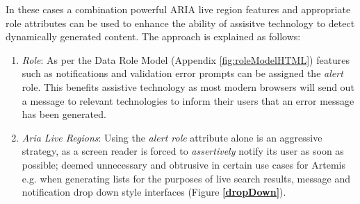 \begin{enumerate}
In these cases a combination powerful ARIA live region features and appropriate role attributes can be used to enhance the ability of assisitve technology to detect dynamically generated content. The approach is explained as follows:
\begin{enumerate}
    \item \textit{Role}: As per the Data Role Model (Appendix \ref{fig:roleModelHTML}) features such as notifications and validation error prompts can be assigned the \textit{alert} role. This benefits assistive technology as  most modern browsers will send out a message to relevant technologies to inform their users \cite{MozillaDeveloperNetwork2017a} that an error message has been generated.
    \item \textit{Aria Live Regions}: Using the \textit{alert role} attribute alone is an aggressive strategy\cite{MozillaDeveloperNetwork2017a}, as a screen reader is forced to \textit{assertively} notify it\textquotesingle s user as soon as possible; deemed unnecessary and obtrusive in certain use cases for Artemis e.g. when generating lists for the purposes of live search results, message and notification drop down style interfaces (Figure \textbf{\ref{dropDown}}).


\end{enumerate}
\end{enumerate}
